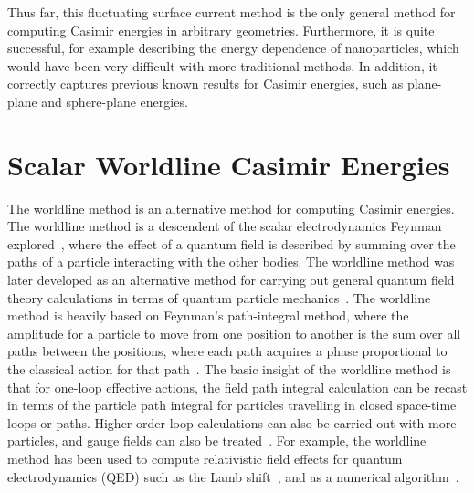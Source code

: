 Thus far, this fluctuating surface current method is the only general method for computing 
Casimir energies in arbitrary geometries.  Furthermore, it is quite successful,
for example describing the energy dependence of nanoparticles, which would have been very difficult
with more traditional methods.  In addition, it correctly captures previous known results
for Casimir energies, such as plane-plane and sphere-plane energies.  






\section{Scalar Worldline Casimir Energies}

The worldline method is an alternative method for computing Casimir energies.
The worldline method is a descendent of the scalar electrodynamics 
Feynman explored~\cite{Feynman1950}, where the effect of a quantum
field is described by summing over the paths of a particle interacting with the other bodies. 
The worldline method was later developed as an alternative method for 
carrying out general quantum field theory calculations in terms of quantum particle 
mechanics~\cite{McKeon1993, Strassler1992,Schubert2001}.  
The worldline method is heavily based on Feynman's path-integral method, where the amplitude
for a particle to move from one position to another is the sum over all paths between the positions,
where each path acquires a phase proportional to the classical action for that path~\cite{Feynman1948,Feynman1965}.
The basic insight of the worldline method is that for one-loop effective actions, 
the field path integral calculation can be recast in terms of the particle path
 integral for particles travelling in closed space-time loops or paths.
  Higher order loop calculations can also be carried out with more particles, 
and gauge fields can also be treated~\cite{Schubert2001}.
  For example, the worldline method has been used to compute relativistic
 field effects for quantum electrodynamics (QED) such as the Lamb shift~\cite{Schmidt1995},
 and as a numerical algorithm~\cite{Mazur2014}.


